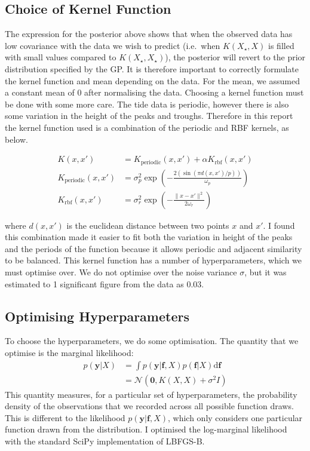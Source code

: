 \documentclass[10pt]{article}
\begin{document}
\subsection*{Choice of Kernel Function}
The expression for the posterior above shows that when the observed data has low covariance with the data we wish to predict 
(i.e.\ when $K(X_{\star}, X)$ is filled with small values compared to $K(X_{\star}, X_{\star})$), the posterior will
revert to the prior distribution specified by the GP\@. It is therefore important to correctly formulate the kernel function and mean
depending on the data. For the mean, we assumed a constant mean of 0 after normalising the data. Choosing a kernel function must be done
with some more care. The tide data is periodic, however there is also some variation
in the height of the peaks and troughs. Therefore in this report the kernel function used is a combination of the periodic and RBF kernels, as below.

\begin{align*}
    K(x, x') &= K_{\text{periodic}}(x, x') + \alpha K_{\text{rbf}}(x, x') \\
    K_{\text{periodic}}(x, x') &= \sigma_p^2 \exp\left(- \frac{2\left(\sin(\pi d(x, x') / p)\right)}{\omega_p}\right) \\
    K_{\text{rbf}}(x, x') &= \sigma_r^2 \exp\left(- \frac{\|x - x'\|^2}{2\omega_r}\right)
\end{align*}

where $d(x, x')$ is the euclidean distance between two points $x$ and $x'$. I found this combination made it easier to fit both the variation
in height of the peaks and the periods of the function because it allows periodic and adjacent similarity to be balanced. 
This kernel function
has a number of hyperparameters, which we must optimise over.
We do not optimise over the noise variance $\sigma$, but it was estimated to 1 significant figure from the data as $0.03$. 

\subsection*{Optimising Hyperparameters}

To choose the hyperparameters, we do some optimisation. The quantity that we optimise is the marginal likelihood:
\begin{align*}
    p(\mathbf{y} | X) &= \int p(\mathbf{y} | \mathbf{f}, X) p(\mathbf{f} | X) \text{d}\mathbf{f} \\
                      &= \mathcal{N}(\mathbf{0}, K(X, X) + \sigma^2 I)
\end{align*}
This quantity measures, for a particular set of hyperparameters, the probability density of the observations that we recorded across all 
possible function draws. This is different to the likelihood $p(\mathbf{y} | \mathbf{f}, X)$, which only considers one particular function
drawn from the distribution. I optimised the log-marginal likelihood with the standard SciPy implementation of LBFGS-B.
\end{document}

